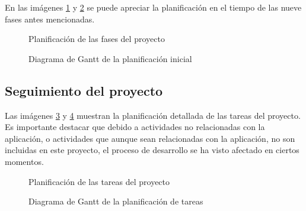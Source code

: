         En las imágenes \ref{fig:gantt-initial-tasks} y \ref{fig:gantt-initial-diagram} se puede apreciar la planificación en el tiempo de las nueve fases antes mencionadas.
        
        \begin{figure}[h!]
        \centering
            \caption{Planificación de las fases del proyecto}
            \label{fig:gantt-initial-tasks}
        \end{figure}
        
        \begin{figure}[h!]
        \centering
            \caption{Diagrama de Gantt de la planificación inicial}
            \label{fig:gantt-initial-diagram}
        \end{figure}
        
    \subsection{Seguimiento del proyecto}
        
        Las imágenes \ref{fig:gantt-followup-tasks} y \ref{fig:gantt-followup-diagram} muestran la planificación detallada de las tareas del proyecto. Es importante destacar que debido a actividades no relacionadas con la aplicación, o actividades que aunque sean relacionadas con la aplicación, no son incluidas en este proyecto, el proceso de desarrollo se ha visto afectado en ciertos momentos. 
        
        \begin{figure}[h!]
        \centering
            \caption{Planificación de las tareas del proyecto}
            \label{fig:gantt-followup-tasks}
        \end{figure}
    
        \begin{figure}[h!]
        \centering
            \caption{Diagrama de Gantt de la planificación de tareas}
            \label{fig:gantt-followup-diagram}
        \end{figure}